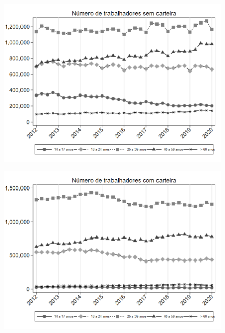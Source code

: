 \begin{frame}[label=_composicao_demografica_faixa_etaria_n_empregadoSC]{}
\textit{\hyperlink{_composicao_demografica_faixa_etaria}{}}
\begin{figure}
  \centering
  \includegraphics[width=1.0\linewidth]{../../analysis/output/composicao_demografica/faixa_etaria/_composicao_demografica_faixa_etaria_n_empregadoSC.png}
  \caption{}
  \label{fig:_composicao_demografica_faixa_etaria_n_empregadoSC}
\end{figure}
\end{frame}

\begin{frame}[label=_composicao_demografica_faixa_etaria_n_empregadoCC]{}
\textit{\hyperlink{_composicao_demografica_faixa_etaria}{}}
\begin{figure}
  \centering
  \includegraphics[width=1.0\linewidth]{../../analysis/output/composicao_demografica/faixa_etaria/_composicao_demografica_faixa_etaria_n_empregadoCC.png}
  \caption{}
  \label{fig:_composicao_demografica_faixa_etaria_n_empregadoCC}
\end{figure}
\end{frame}

